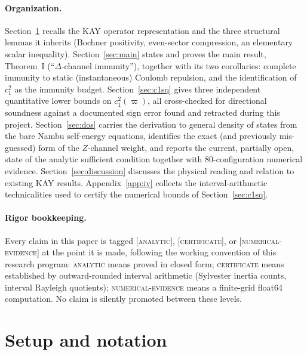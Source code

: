 \documentclass[11pt]{article}
\begin{document}
\paragraph{Organization.} Section~\ref{sec:setup} recalls the KAY operator
representation and the three structural lemmas it inherits (Bochner
positivity, even-sector compression, an elementary scalar inequality).
Section~\ref{sec:main} states and proves the main result, Theorem~I
(``$\Delta$-channel immunity''), together with its two corollaries: complete
immunity to static (instantaneous) Coulomb repulsion, and the identification
of $c_1^2$ as the immunity budget. Section~\ref{sec:c1sq} gives three
independent quantitative lower bounds on $c_1^2(\varpi)$, all cross-checked
for directional soundness against a documented sign error found and
retracted during this project. Section~\ref{sec:dos} carries the derivation
to general density of states from the bare Nambu self-energy equations,
identifies the exact (and previously mis-guessed) form of the $Z$-channel
weight, and reports the current, partially open, state of the analytic
sufficient condition together with 80-configuration numerical evidence.
Section~\ref{sec:discussion} discusses the physical reading and relation to
existing KAY results. Appendix~\ref{app:iv} collects the interval-arithmetic
technicalities used to certify the numerical bounds of
Section~\ref{sec:c1sq}.

\paragraph{Rigor bookkeeping.} Every claim in this paper is tagged
\textsc{[analytic]}, \textsc{[certificate]}, or \textsc{[numerical-evidence]}
at the point it is made, following the working convention of this research
program: \textsc{analytic} means proved in closed form; \textsc{certificate}
means established by outward-rounded interval arithmetic (Sylvester inertia
counts, interval Rayleigh quotients); \textsc{numerical-evidence} means a
finite-grid float64 computation. No claim is silently promoted between these
levels.

\section{Setup and notation}\label{sec:setup}
\end{document}
